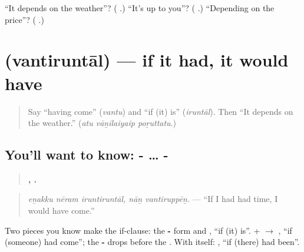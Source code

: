 \begin{tcolorbox}[breakable,colback=teal!4,colframe=teal!35!black,title={Before you move on}]
\textquotedblleft{}It depends on the weather\textquotedblright{}? (\textbf{ }.) \textquotedblleft{}It's up to you\textquotedblright{}? (\textbf{  }.) \textquotedblleft{}Depending on the price\textquotedblright{}? (\textbf{ }.)
\end{tcolorbox}
\section[\texorpdfstring{\ta{வந்திருந்தால்} (vantiruntāl)}{வந்திருந்தால் (vantiruntāl)}]{ (vantiruntāl) — if it had, it would have}

\label{lesson:TA-C293-vantiruntal}



\begin{quote}
Say \textquotedblleft{}having come\textquotedblright{} (\emph{vantu}) and \textquotedblleft{}if (it) is\textquotedblright{} (\emph{iruntāl}). Then \textquotedblleft{}It depends on the weather.\textquotedblright{} (\emph{atu vāṉilaiyaip poṟuttatu}.)
\end{quote}

\subsection*{You'll want to know: - … -}
\begin{quote}
\textbf{  ,  .}
\end{quote}

\begin{quote}
\emph{eṉakku nēram iruntiruntāl, nāṉ vantiruppēṉ.} — \textquotedblleft{}If I had had time, I would have come.\textquotedblright{}
\end{quote}

Two pieces you know make the if-clause: the \textbf{-} form and \textbf{}, \textquotedblleft{}if (it) is\textquotedblright{}. \textbf{} + \textbf{} $\to$ \textbf{}, \textquotedblleft{}if (someone) had come\textquotedblright{}; the \textbf{-} drops before the \textbf{}. With \textbf{} itself: \textbf{}, \textquotedblleft{}if (there) had been\textquotedblright{}.

